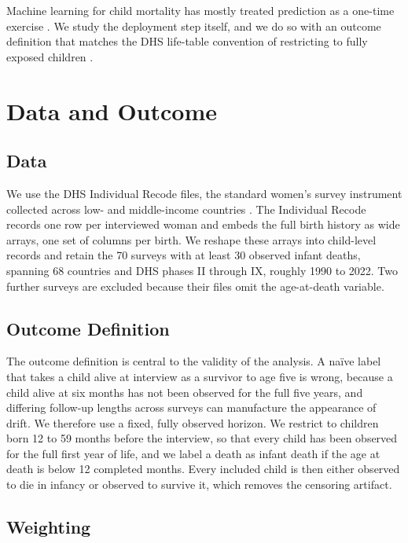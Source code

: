 \documentclass[letterpaper]{article} %
\begin{document}
Machine learning for child mortality has mostly treated prediction as a one-time exercise \citep{bountogo2023machine}. We study the deployment step itself, and we do so with an outcome definition that matches the DHS life-table convention of restricting to fully exposed children \citep{croft2018guide}.

\section{Data and Outcome}

\subsection{Data}

We use the DHS Individual Recode files, the standard women's survey instrument collected across low- and middle-income countries \citep{rutstein2006guide, croft2018guide}. The Individual Recode records one row per interviewed woman and embeds the full birth history as wide arrays, one set of columns per birth. We reshape these arrays into child-level records and retain the 70 surveys with at least 30 observed infant deaths, spanning 68 countries and DHS phases II through IX, roughly 1990 to 2022. Two further surveys are excluded because their files omit the age-at-death variable.

\subsection{Outcome Definition}

The outcome definition is central to the validity of the analysis. A na\"ive label that takes a child alive at interview as a survivor to age five is wrong, because a child alive at six months has not been observed for the full five years, and differing follow-up lengths across surveys can manufacture the appearance of drift. We therefore use a fixed, fully observed horizon. We restrict to children born 12 to 59 months before the interview, so that every child has been observed for the full first year of life, and we label a death as infant death if the age at death is below 12 completed months. Every included child is then either observed to die in infancy or observed to survive it, which removes the censoring artifact.

\subsection{Weighting}
\end{document}
